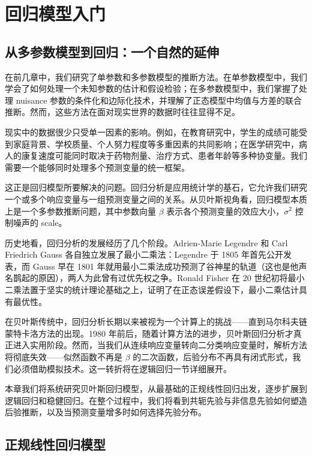 
\chapter{回归模型入门}
\label{ch:reg}

\section{从多参数模型到回归：一个自然的延伸}

在前几章中，我们研究了单参数和多参数模型的推断方法。在单参数模型中，我们学会了如何处理一个未知参数的估计和假设检验；在多参数模型中，我们掌握了处理 nuisance 参数的条件化和边际化技术，并理解了正态模型中均值与方差的联合推断。然而，这些方法在面对现实世界的数据时往往显得不足。

现实中的数据很少只受单一因素的影响。例如，在教育研究中，学生的成绩可能受到家庭背景、学校质量、个人努力程度等多重因素的共同影响；在医学研究中，病人的康复速度可能同时取决于药物剂量、治疗方式、患者年龄等多种协变量。我们需要一个能够同时处理多个预测变量的统一框架。

这正是回归模型所要解决的问题。回归分析是应用统计学的基石，它允许我们研究一个或多个响应变量与一组预测变量之间的关系。从贝叶斯视角看，回归模型本质上是一个多参数推断问题，其中参数向量 $\beta$ 表示各个预测变量的效应大小，$\sigma^2$ 控制噪声的 scale。

历史地看，回归分析的发展经历了几个阶段。Adrien-Marie Legendre 和 Carl Friedrich Gauss 各自独立发展了最小二乘法：Legendre 于 1805 年首先公开发表，而 Gauss 早在 1801 年就用最小二乘法成功预测了谷神星的轨道（这也是他声名鹊起的原因），两人为此曾有过优先权之争。Ronald Fisher 在 20 世纪初将最小二乘法置于坚实的统计理论基础之上，证明了在正态误差假设下，最小二乘估计具有最优性。

在贝叶斯传统中，回归分析长期以来被视为一个计算上的挑战——直到马尔科夫链蒙特卡洛方法的出现。1980 年前后，随着计算方法的进步，贝叶斯回归分析才真正进入实用阶段。然而，当我们从连续响应变量转向二分类响应变量时，解析方法将彻底失效——似然函数不再是 $\beta$ 的二次函数，后验分布不再具有闭式形式，我们必须借助模拟技术。这一转折将在逻辑回归一节详细展开。

本章我们将系统研究贝叶斯回归模型，从最基础的正规线性回归出发，逐步扩展到逻辑回归和稳健回归。在整个过程中，我们将看到共轭先验与非信息先验如何塑造后验推断，以及当预测变量增多时如何选择先验分布。

\section{正规线性回归模型}

